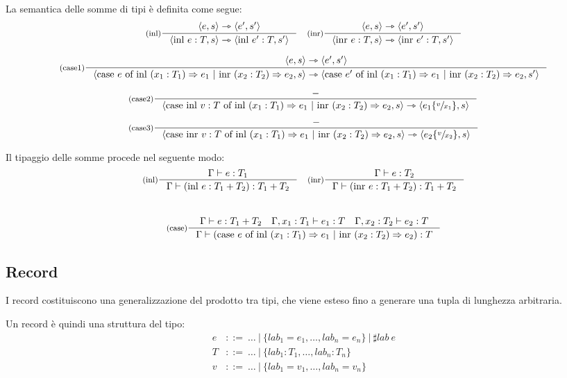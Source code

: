 \documentclass[a4paper, 11pt]{article}
\newcommand{\type}{\Gamma \vdash}
\newcommand{\subs}[3]{#1 \lbrace \sfrac{#2}{#3} \rbrace}
\newcommand{\goesto}{\rightarrowtriangle}
\begin{document}
La semantica delle somme di tipi è definita come segue: \begin{align*}
	\inference[(inl)]{\langle e,s \rangle \goesto \langle e',s' \rangle}{\langle \text{inl }e:T,s \rangle \goesto \langle \text{inl } e':T, s' \rangle} \quad \inference[(inr)]{\langle e,s \rangle \goesto \langle e',s' \rangle}{\langle \text{inr }e:T,s \rangle \goesto \langle \text{inr } e':T, s' \rangle}
\end{align*}
\begin{adjustwidth}{-1.7cm}{}
	\begin{align*}
	\inference[(case1)]{\langle e,s \rangle \goesto \langle e',s' \rangle}{\langle \text{case } e \text{ of inl }(x_1:T_1) \Rightarrow e_1\ |\ \text{inr } (x_2:T_2) \Rightarrow e_2, s \rangle \goesto \langle \text{case } e' \text{ of inl }(x_1:T_1) \Rightarrow e_1\ |\ \text{inr } (x_2:T_2) \Rightarrow e_2, s' \rangle}
	\end{align*}
\end{adjustwidth}
\newpage
\begin{align*}
	&\inference[(case2)]{-}{\langle \text{case inl } v:T \text{ of inl }(x_1:T_1) \Rightarrow e_1\ |\ \text{inr } (x_2:T_2) \Rightarrow e_2, s \rangle \goesto \langle \subs{e_1}{v}{x_1},s \rangle} \\ \\
	&\inference[(case3)]{-}{\langle \text{case inr } v:T \text{ of inl }(x_1:T_1) \Rightarrow e_1\ |\ \text{inr } (x_2:T_2) \Rightarrow e_2, s \rangle \goesto \langle \subs{e_2}{v}{x_2},s \rangle} \\
\end{align*}

Il tipaggio delle somme procede nel seguente modo: 
\[
	\inference[(inl)]{\type e:T_1}{\type (\text{inl } e:T_1+T_2):T_1+T_2} \quad \inference[(inr)]{\type e:T_2}{\type (\text{inr } e:T_1+T_2):T_1+T_2} 
\]
\\
\[
	\inference[(case)]{\type e:T_1+T_2 \quad \Gamma, x_1: T_1 \vdash e_1:T \quad \Gamma, x_2: T_2 \vdash e_2:T}{\type (\text{case } e \text{ of inl }(x_1:T_1) \Rightarrow e_1\ |\ \text{inr } (x_2:T_2) \Rightarrow e_2):T}
\]

\subsection{Record}
I record costituiscono una generalizzazione del prodotto tra tipi, che viene esteso fino a generare una tupla di lunghezza arbitraria.

Un record è quindi una struttura del tipo:
\begin{align*}
	e &::=\ \dots\ |\ \lbrace lab_1=e_1, \dots, lab_n = e_n \rbrace\ |\ \sharp lab\ e \\
	T &::=\ \dots\ |\ \lbrace lab_1:T_1, \dots, lab_n:T_n \rbrace \\
	v &::=\ \dots\ |\ \lbrace lab_1=v_1, \dots, lab_n = v_n \rbrace
\end{align*}
\end{document}
